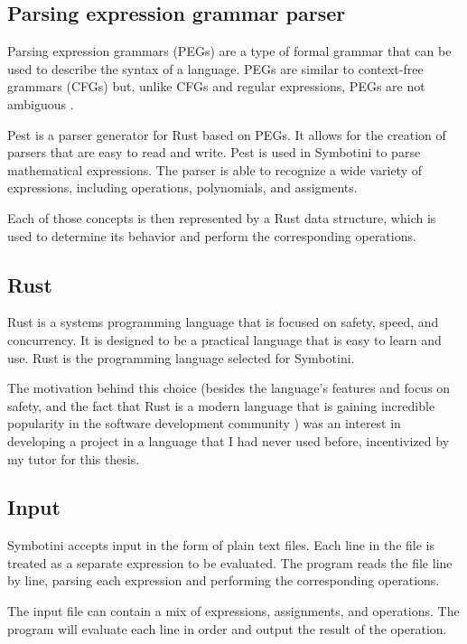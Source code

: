 \subsection{Parsing expression grammar parser}\label{subsec:peg-parser}

Parsing expression grammars (PEGs) are a type of formal grammar that can be used to describe the syntax of a language. PEGs are similar to context-free grammars (CFGs) but, unlike CFGs and regular expressions, PEGs are not ambiguous \parencite{pest-book,ford2004parsing}.

Pest \parencite{pest-book} is a parser generator for Rust based on PEGs. It allows for the creation of parsers that are easy to read and write. Pest is used in Symbotini to parse mathematical expressions. The parser is able to recognize a wide variety of expressions, including operations, polynomials, and assigments.

Each of those concepts is then represented by a Rust data structure, which is used to determine its behavior and perform the corresponding operations.

\subsection{Rust}\label{subsec:rust}

Rust \parencite{matsakis2014rust} is a systems programming language that is focused on safety, speed, and concurrency. It is designed to be a practical language that is easy to learn and use. Rust is the programming language selected for Symbotini.

The motivation behind this choice (besides the language's features and focus on safety, and the fact that Rust is a modern language that is gaining incredible popularity in the software development community \parencite{stack-overflow-survey}) was an interest in developing a project in a language that I had never used before, incentivized by my tutor for this thesis.

\subsection{Input}\label{subsec:input}

Symbotini accepts input in the form of plain text files. Each line in the file is treated as a separate expression to be evaluated. The program reads the file line by line, parsing each expression and performing the corresponding operations.

The input file can contain a mix of expressions, assignments, and operations. The program will evaluate each line in order and output the result of the operation.

